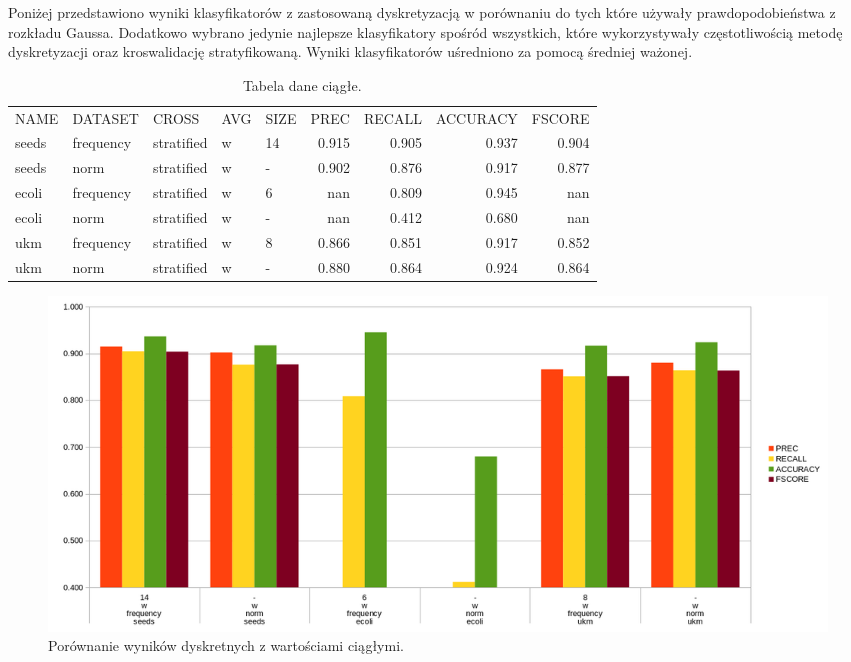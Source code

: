 Poniżej przedstawiono wyniki klasyfikatorów z zastosowaną dyskretyzacją w porównaniu do tych które używały prawdopodobieństwa z rozkładu Gaussa. Dodatkowo wybrano jedynie najlepsze klasyfikatory spośród wszystkich, które wykorzystywały częstotliwością metodę dyskretyzacji oraz kroswalidację stratyfikowaną. Wyniki klasyfikatorów uśredniono za pomocą średniej ważonej.

\begin{table}[H]
\centering
\caption{Tabela dane ciągłe.}
\label{table-norm}
\begin{tabular}{lllllrrrr}
NAME  & DATASET   & CROSS      & AVG & SIZE & PREC  & RECALL & ACCURACY & FSCORE \\
seeds & frequency & stratified & w   & 14   & 0.915 & 0.905  & 0.937    & 0.904  \\
seeds & norm      & stratified & w   & -    & 0.902 & 0.876  & 0.917    & 0.877  \\
ecoli & frequency & stratified & w   & 6    & nan   & 0.809  & 0.945    & nan    \\
ecoli & norm      & stratified & w   & -    & nan   & 0.412  & 0.680    & nan    \\
ukm   & frequency & stratified & w   & 8    & 0.866 & 0.851  & 0.917    & 0.852  \\
ukm   & norm      & stratified & w   & -    & 0.880 & 0.864  & 0.924    & 0.864 
\end{tabular}
\end{table}
\begin{figure}[H]
	\centering
		\includegraphics[width=1.0\linewidth]{norm.png}
	\caption[Porównanie wyników dyskretnych z wartościami ciągłymi.]{Porównanie wyników dyskretnych z wartościami ciągłymi.}
	\label{fig:norm}
\end{figure}
